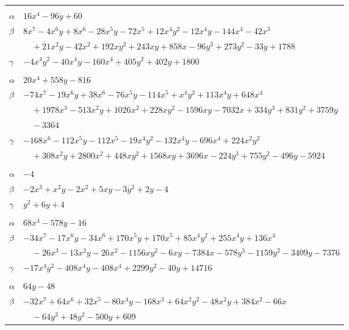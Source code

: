 \documentclass[11pt]{article}
\begin{document}
\begin{longtable}{@{}ll@{}}
\addlinespace[3pt]
\multicolumn{2}{@{}l}{$\{i,j\}=\{17,29\}$, $k_{ij}=2^{2}\cdot 3\cdot 11\cdot 13$}\\
$\alpha$ & $16x^{4}-96y+60$\\
$\beta$ & $8x^{7}-4x^{6}y+8x^{6}-28x^{5}y-72x^{5}+12x^{4}y^{2}-12x^{4}y-144x^{4}-42x^{3}$\\
 & $\quad +21x^{2}y-42x^{2}+192xy^{2}+243xy+858x-96y^{3}+273y^{2}-33y+1788$\\
$\gamma$ & $-4x^{4}y^{2}-40x^{4}y-160x^{4}+405y^{2}+402y+1800$\\
\addlinespace[3pt]
\multicolumn{2}{@{}l}{$\{i,j\}=\{17,35\}$, $k_{ij}=2^{2}\cdot 3$}\\
$\alpha$ & $20x^{4}+558y-816$\\
$\beta$ & $-74x^{7}-19x^{6}y+38x^{6}-76x^{5}y-114x^{5}+x^{4}y^{2}+113x^{4}y+648x^{4}$\\
 & $\quad +1978x^{3}-513x^{2}y+1026x^{2}+228xy^{2}-1596xy-7032x+334y^{3}+831y^{2}+3759y$\\
 & $\quad -3364$\\
$\gamma$ & $-168x^{6}-112x^{5}y-112x^{5}-19x^{4}y^{2}-132x^{4}y-696x^{4}+224x^{2}y^{2}$\\
 & $\quad +308x^{2}y+2800x^{2}+448xy^{2}+1568xy+3696x-224y^{3}+755y^{2}-496y-5924$\\
\addlinespace[3pt]
\multicolumn{2}{@{}l}{$\{i,j\}=\{17,37\}$, $k_{ij}=2^{2}$}\\
$\alpha$ & $-4$\\
$\beta$ & $-2x^{3}+x^{2}y-2x^{2}+5xy-3y^{2}+2y-4$\\
$\gamma$ & $y^{2}+6y+4$\\
\addlinespace[3pt]
\multicolumn{2}{@{}l}{$\{i,j\}=\{18,23\}$, $k_{ij}=2^{2}\cdot 13$}\\
$\alpha$ & $68x^{4}-578y-16$\\
$\beta$ & $-34x^{7}-17x^{6}y-34x^{6}+170x^{5}y+170x^{5}+85x^{4}y^{2}+255x^{4}y+136x^{4}$\\
 & $\quad -26x^{3}-13x^{2}y-26x^{2}-1156xy^{2}-6xy-7384x-578y^{3}-1159y^{2}-3409y-7376$\\
$\gamma$ & $-17x^{4}y^{2}-408x^{4}y-408x^{4}+2299y^{2}-40y+14716$\\
\addlinespace[3pt]
\multicolumn{2}{@{}l}{$\{i,j\}=\{19,35\}$, $k_{ij}=3^{3}\cdot 7$}\\
$\alpha$ & $64y-48$\\
$\beta$ & $-32x^{7}+64x^{6}+32x^{5}-80x^{4}y-168x^{3}+64x^{2}y^{2}-48x^{2}y+384x^{2}-66x$\\
 & $\quad -64y^{3}+48y^{2}-500y+609$\\

\end{longtable}
\end{document}
